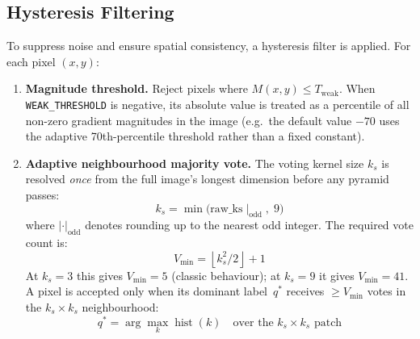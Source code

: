 \documentclass[12pt,a4paper]{article}
\begin{document}
\subsection{Hysteresis Filtering}
To suppress noise and ensure spatial consistency, a hysteresis filter is applied.
For each pixel $(x,y)$:
\begin{enumerate}
  \item \textbf{Magnitude threshold.}  Reject pixels where
        $M(x,y) \leq T_\text{weak}$.  When \texttt{WEAK\_THRESHOLD} is negative,
        its absolute value is treated as a percentile of all non-zero gradient
        magnitudes in the image (e.g.\ the default value $-70$ uses the adaptive
        70th-percentile threshold rather than a fixed constant).

  \item \textbf{Adaptive neighbourhood majority vote.}  The voting kernel size
        $k_s$ is resolved \emph{once} from the full image's longest dimension
        before any pyramid passes:
        \begin{equation}
          k_s = \min\!\bigl(\text{raw\_ks} \mid_{\text{odd}},\; 9\bigr)
        \end{equation}
        where $|\cdot|_\text{odd}$ denotes rounding up to the nearest odd integer.
        The required vote count is:
        \begin{equation}
          V_\text{min} = \left\lfloor k_s^2 / 2 \right\rfloor + 1
        \end{equation}
        At $k_s = 3$ this gives $V_\text{min} = 5$ (classic behaviour); at
        $k_s = 9$ it gives $V_\text{min} = 41$.  A pixel is accepted only when its
        dominant label~$q^*$ receives $\geq V_\text{min}$ votes in the
        $k_s \times k_s$ neighbourhood:
        \begin{equation}
          q^* = \arg\max_k \operatorname{hist}(k)
          \quad\text{over the } k_s \times k_s \text{ patch}
        \end{equation}
\end{enumerate}
\end{document}
